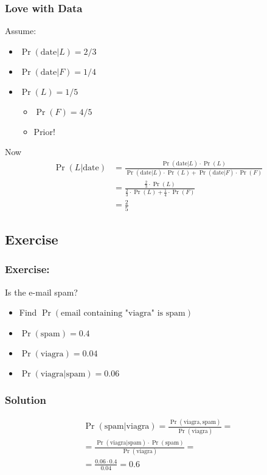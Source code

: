 \documentclass[mathserif, xcolor=table, svgnames]{beamer}
\begin{document}
\begin{frame}
  \frametitle{Love with Data}
  Assume:
  \begin{itemize}
  \item $\Pr(\text{date}|L) = 2/3$
  \item $\Pr(\text{date}|F) = 1/4$
  \item $\Pr(L) = 1/5$
    \begin{itemize}
    \item $\Pr(F) = 4/5$
    \item Prior!
    \end{itemize}
  \end{itemize}
  Now
  \begin{align*}
    \Pr(L|\text{date}) 
    &= 
    \frac{\Pr(\text{date}|L) \cdot \Pr(L)}
    {\Pr(\text{date}|L) \cdot \Pr(L) + \Pr(\text{date}|F) \cdot
      \Pr(F)}
    \\
    &=
      \frac{\frac{2}{3} \cdot \Pr(L)}
    {\frac{2}{3} \cdot \Pr(L) + \frac{1}{4} \cdot \Pr(F)}
    \\
    &= \frac{2}{5}
  \end{align*}
\end{frame}

\subsection{Exercise}
\frame{\tableofcontents[currentsubsection]}

\begin{frame}
  \frametitle{Exercise:}
  Is the e-mail spam?
  \begin{itemize}
  \item Find $\Pr(\text{email containing "viagra" is spam})$
  \item $\Pr(\text{spam}) = 0.4$
  \item $\Pr(\text{viagra}) = 0.04$
  \item $\Pr(\text{viagra}|\text{spam}) = 0.06$
  \end{itemize}
\end{frame}

\begin{frame}
  \frametitle{Solution}
  \begin{multline*}
    \Pr(\text{spam}|\text{viagra}) 
    =
    \frac{\Pr(\text{viagra}, \text{spam})}{\Pr(\text{viagra})}
    = \\ =
    \frac{\Pr(\text{viagra}| \text{spam}) \cdot
      \Pr(\text{spam})}{\Pr(\text{viagra})}
    = \\ =
    \frac{0.06 \cdot 0.4 }{ 0.04 }
    = 0.6
  \end{multline*}
\end{frame}
\end{document}
